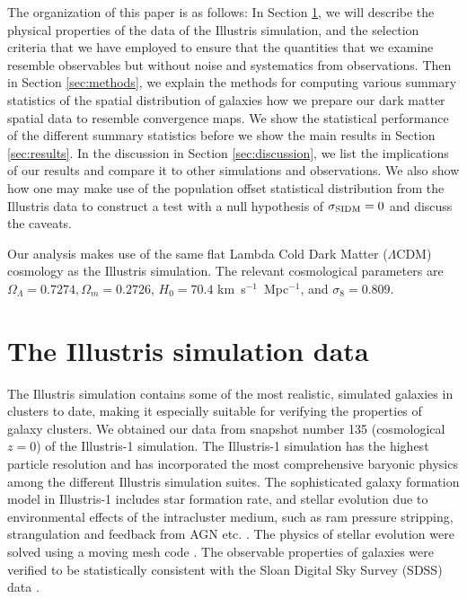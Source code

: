The organization of this paper is as follows:
In Section \ref{sec:illustris_sim}, we will describe the physical properties of 
the data of the Illustris
simulation, 
and the selection criteria that we have employed to ensure that the
quantities that we examine resemble observables but without noise and
systematics from observations. 
Then in Section \ref{sec:methods}, 
we explain the methods for computing various 
summary statistics of the spatial distribution of galaxies how we prepare our dark
matter spatial data to resemble convergence maps. We show the statistical performance
of the different summary statistics before we show the main results
in Section \ref{sec:results}. In the discussion in Section \ref{sec:discussion}, 
we list the implications of our
results and compare it to other simulations and observations. We also 
show how one may make use of the population offset statistical distribution
from the Illustris data to construct a test with 
a null hypothesis of $\sigma_{\rm SIDM} = 0$ and discuss the caveats. 

	Our analysis makes use of the same flat Lambda Cold Dark Matter ($\Lambda$CDM) cosmology
as the Illustris simulation. The relevant cosmological parameters are
$\Omega_\Lambda = 0.7274, \Omega_m = 0.2726$, $H_0 = 70.4$
km~s$^{-1}$~Mpc$^{-1}$, and $\sigma_8 = 0.809$.

\section{The Illustris simulation data} 
\label{sec:illustris_sim}
The Illustris simulation contains some of the most
realistic, simulated galaxies in clusters to date, making it especially suitable for 
verifying the properties of galaxy clusters. We obtained our data from 
snapshot number 135 (cosmological $z=0$) of the Illustris-1 simulation. The Illustris-1
simulation has the highest particle resolution and has incorporated the most 
comprehensive baryonic physics among the different Illustris simulation suites. 
The sophisticated galaxy formation model in Illustris-1 
includes star formation rate, and stellar evolution due to
environmental effects of the intracluster medium, such as ram pressure stripping,
strangulation and feedback from AGN etc. \citep{Genel2014a}.
The physics of stellar
evolution were solved using a moving mesh code {} \citep{Springel2010}.
The observable properties of galaxies were verified to be statistically consistent
with the Sloan Digital Sky Survey (SDSS) data
\citep{Vogelsberger2014}. 

